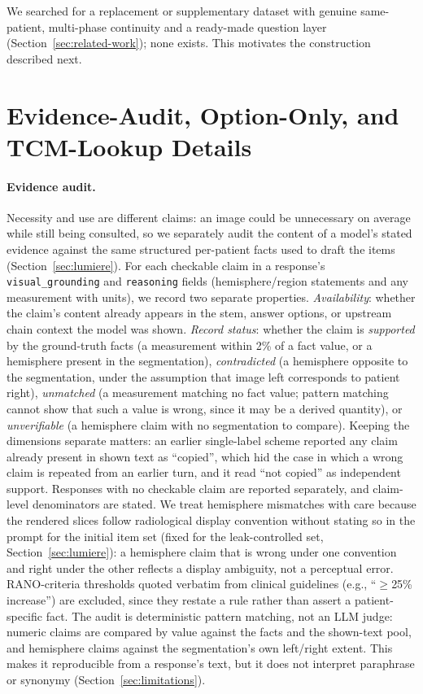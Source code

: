 \documentclass[11pt]{article}
\begin{document}
We searched for a replacement or supplementary dataset with genuine same-patient, multi-phase continuity and a ready-made question layer (Section~\ref{sec:related-work}); none exists. This motivates the construction described next.


\section{Evidence-Audit, Option-Only, and TCM-Lookup Details}
\label{sec:app-audit}

\paragraph{Evidence audit.} Necessity and use are different claims: an image could be unnecessary on average while still being consulted, so we separately audit the content of a model's stated evidence against the same structured per-patient facts used to draft the items (Section~\ref{sec:lumiere}). For each checkable claim in a response's \texttt{visual\_grounding} and \texttt{reasoning} fields (hemisphere/region statements and any measurement with units), we record two separate properties. \emph{Availability}: whether the claim's content already appears in the stem, answer options, or upstream chain context the model was shown. \emph{Record status}: whether the claim is \emph{supported} by the ground-truth facts (a measurement within 2\% of a fact value, or a hemisphere present in the segmentation), \emph{contradicted} (a hemisphere opposite to the segmentation, under the assumption that image left corresponds to patient right), \emph{unmatched} (a measurement matching no fact value; pattern matching cannot show that such a value is wrong, since it may be a derived quantity), or \emph{unverifiable} (a hemisphere claim with no segmentation to compare). Keeping the dimensions separate matters: an earlier single-label scheme reported any claim already present in shown text as ``copied'', which hid the case in which a wrong claim is repeated from an earlier turn, and it read ``not copied'' as independent support. Responses with no checkable claim are reported separately, and claim-level denominators are stated. We treat hemisphere mismatches with care because the rendered slices follow radiological display convention without stating so in the prompt for the initial item set (fixed for the leak-controlled set, Section~\ref{sec:lumiere}): a hemisphere claim that is wrong under one convention and right under the other reflects a display ambiguity, not a perceptual error. RANO-criteria thresholds quoted verbatim from clinical guidelines (e.g., ``$\geq$25\% increase'') are excluded, since they restate a rule rather than assert a patient-specific fact. The audit is deterministic pattern matching, not an LLM judge: numeric claims are compared by value against the facts and the shown-text pool, and hemisphere claims against the segmentation's own left/right extent. This makes it reproducible from a response's text, but it does not interpret paraphrase or synonymy (Section~\ref{sec:limitations}).
\end{document}
